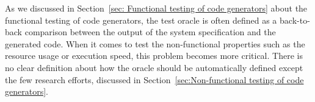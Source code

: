 As we discussed in Section~\ref{sec: Functional testing of code generators} about the functional testing of code generators, the test oracle is often defined as a back-to-back comparison between the output of the system specification and the generated code.
When it comes to test the non-functional properties such as the resource usage or execution speed, this problem becomes more critical. There is no clear definition about how the oracle should be automatically defined except the few research efforts, discussed in Section~\ref{sec:Non-functional testing of code generators}. 





